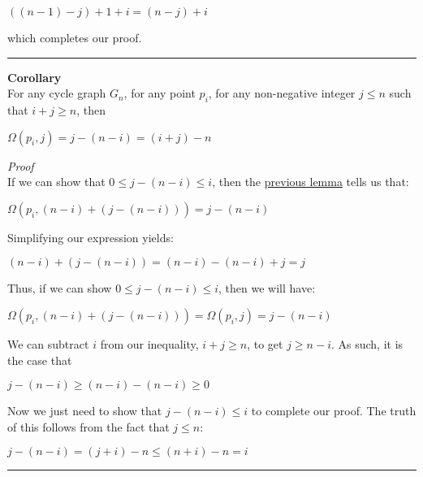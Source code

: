 \documentclass[a4paper,12pt]{article}
\begin{document}
\begin{center}
$((n - 1) - j) + 1 + i = (n - j) + i$
\end{center}

\noindent which completes our proof.

\begin{center}
\noindent\rule{8cm}{0.4pt}
\end{center}


\label{corollary:Omega_result_2}
\begin{tcolorbox}
\textbf{Corollary}\\
For any cycle graph $G_n$, for any point $p_i$, for any non-negative integer $j \leq n$ such that $i + j \geq n$, then

\begin{center}
$\Omega(p_i, j) = j - (n - i) = (i + j) - n$
\end{center}
\end{tcolorbox}

\noindent
\textit{Proof}\\
If we can show that $0 \leq j - (n - i) \leq i$, then the \hyperlink{lemma:existence_of_walk_2}{previous lemma} tells us that:
\begin{center}
$\Omega(p_i, (n - i) + (j - (n - i))) = j - (n - i)$
\end{center}

\noindent Simplifying our expression yields:
\begin{center}
$(n - i) + (j - (n - i)) = (n - i) - (n - i) + j = j$
\end{center}

\noindent Thus, if we can show $0 \leq j - (n - i) \leq i$, then we will have:
\begin{center}
$\Omega(p_i, (n - i) + (j - (n - i))) = \Omega(p_i, j) = j - (n - i)$
\end{center}

\noindent We can subtract $i$ from our inequality, $i + j \geq n$, to get $j \geq n - i$. As such, it is the case that
\begin{center}
$j - (n - i) \geq (n - i) - (n - i) \geq 0$
\end{center}

\noindent Now we just need to show that $j - (n - i) \leq i$ to complete our proof. The truth of this follows from the fact that $j \leq n$:
\begin{center}
$j - (n - i) = (j + i) - n \leq (n + i) - n = i$
\end{center}

\begin{center}
\noindent\rule{8cm}{0.4pt}
\end{center}
\end{document}
